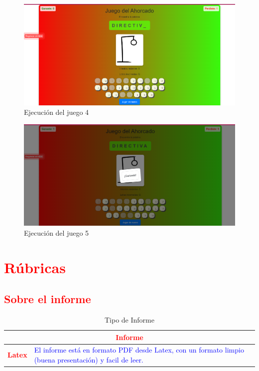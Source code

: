 \documentclass{article}
\begin{document}
\begin{itemize}
\begin{figure}[h]
    \centering
    \includegraphics[width=1\textwidth]{img/game4.png}
    \caption{Ejecución del juego 4}
    \label{fig:game4}
\end{figure}

\begin{figure}[h]
    \centering
    \includegraphics[width=1\textwidth]{img/game5.png}
    \caption{Ejecución del juego 5}
    \label{fig:game5}
\end{figure}


    
    



	\section{\textcolor{red}{Rúbricas}}
	
	\subsection{\textcolor{red}{Sobre el informe}}
	\begin{table}[H]
		\caption{Tipo de Informe}
		\setlength{\tabcolsep}{0.5em} %
		{\renewcommand{\arraystretch}{1.5}%
		\begin{tabular}{|p{3cm}|p{12cm}|}
			\hline
			\multicolumn{2}{|c|}{\textbf{\textcolor{red}{Informe}}}  \\
			\hline 
			\textbf{\textcolor{red}{Latex}} & \textcolor{blue}{El informe está en formato PDF desde Latex,  con un formato limpio (buena presentación) y facil de leer.}   \\ 
			\hline 
			

\end{tabular}}
\end{table}
\end{itemize}
\end{document}

